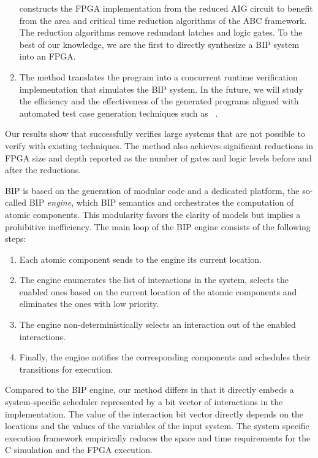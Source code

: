 \begin{enumerate}
  \biptool{} constructs the FPGA implementation from the reduced AIG circuit 
  to benefit from the area and critical time reduction algorithms 
  of the ABC framework. 
  The reduction algorithms remove redundant latches and logic gates.  
  To the best of our knowledge, we are the first to directly synthesize a BIP system into an FPGA. 

\item The method translates the \caig program into a concurrent runtime verification 
  implementation that simulates the BIP system.
In the future, we will study the efficiency and the effectiveness of the generated \caig programs aligned with automated test case generation techniques such as ~\cite{kbse-BurnimS08}.
\end{enumerate}
%

Our results show that \biptool{} successfully verifies large systems that are not possible to verify with existing techniques. 
The method also achieves significant reductions in FPGA size and depth reported as the 
number of gates and logic levels before and after the reductions.

BIP is based on the generation of modular code and a dedicated platform, the so-called BIP \emph{engine}, which  BIP semantics and orchestrates the computation of atomic components. This modularity favors the clarity of models but implies a prohibitive inefficiency. The main loop of the BIP engine consists of the following steps:
%
\begin{enumerate}
\item Each atomic component sends to the engine its current location.
\item The engine enumerates the list of interactions in the system, 
  selects the enabled ones based on the current location of the atomic 
  components and eliminates the ones with low priority.
\item The engine non-deterministically selects an interaction out of the enabled interactions.
\item Finally, the engine notifies the corresponding components and schedules their transitions for execution. 
\end{enumerate}
%
Compared to the BIP engine, our method differs in that it directly embeds a system-specific scheduler represented by a bit vector of interactions in the implementation.
The value of the  interaction bit vector directly depends on the locations and the values of the variables of the input system. 
The system specific execution framework empirically reduces the space and time requirements for the C simulation and the FPGA execution. 

